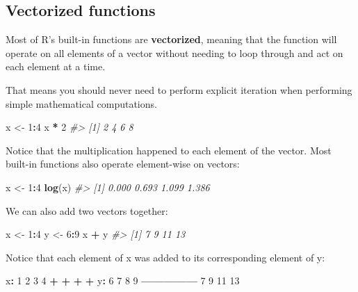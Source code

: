 \documentclass[]{book}
\newenvironment{Shaded}{\begin{snugshade}}{\end{snugshade}}
\newcommand{\KeywordTok}[1]{\textcolor[rgb]{0.13,0.29,0.53}{\textbf{#1}}}
\newcommand{\DecValTok}[1]{\textcolor[rgb]{0.00,0.00,0.81}{#1}}
\newcommand{\StringTok}[1]{\textcolor[rgb]{0.31,0.60,0.02}{#1}}
\newcommand{\CommentTok}[1]{\textcolor[rgb]{0.56,0.35,0.01}{\textit{#1}}}
\newcommand{\OperatorTok}[1]{\textcolor[rgb]{0.81,0.36,0.00}{\textbf{#1}}}
\newcommand{\NormalTok}[1]{#1}
\begin{document}
\subsection{Vectorized functions}\label{vectorized-functions}

Most of R's built-in functions are \textbf{vectorized}, meaning that the
function will operate on all elements of a vector without needing to
loop through and act on each element at a time.

That means you should never need to perform explicit iteration when
performing simple mathematical computations.

\begin{Shaded}
\begin{Highlighting}[]
\NormalTok{x <-}\StringTok{ }\DecValTok{1}\OperatorTok{:}\DecValTok{4}
\NormalTok{x }\OperatorTok{*}\StringTok{ }\DecValTok{2}
\CommentTok{#> [1] 2 4 6 8}
\end{Highlighting}
\end{Shaded}

Notice that the multiplication happened to each element of the vector.
Most built-in functions also operate element-wise on vectors:

\begin{Shaded}
\begin{Highlighting}[]
\NormalTok{x <-}\StringTok{ }\DecValTok{1}\OperatorTok{:}\DecValTok{4}
\KeywordTok{log}\NormalTok{(x)}
\CommentTok{#> [1] 0.000 0.693 1.099 1.386}
\end{Highlighting}
\end{Shaded}

We can also add two vectors together:

\begin{Shaded}
\begin{Highlighting}[]
\NormalTok{x <-}\StringTok{ }\DecValTok{1}\OperatorTok{:}\DecValTok{4}
\NormalTok{y <-}\StringTok{ }\DecValTok{6}\OperatorTok{:}\DecValTok{9}
\NormalTok{x }\OperatorTok{+}\StringTok{ }\NormalTok{y}
\CommentTok{#> [1]  7  9 11 13}
\end{Highlighting}
\end{Shaded}

Notice that each element of x was added to its corresponding element of
y:

\begin{Shaded}
\begin{Highlighting}[]
\NormalTok{x}\OperatorTok{:}\StringTok{  }\DecValTok{1}  \DecValTok{2}  \DecValTok{3}  \DecValTok{4}
    \OperatorTok{+}\StringTok{  }\OperatorTok{+}\StringTok{  }\OperatorTok{+}\StringTok{  }\OperatorTok{+}
\NormalTok{y}\OperatorTok{:}\StringTok{  }\DecValTok{6}  \DecValTok{7}  \DecValTok{8}  \DecValTok{9}
\OperatorTok{---------------}
\StringTok{    }\DecValTok{7}  \DecValTok{9} \DecValTok{11} \DecValTok{13}
\end{Highlighting}
\end{Shaded}
\end{document}
